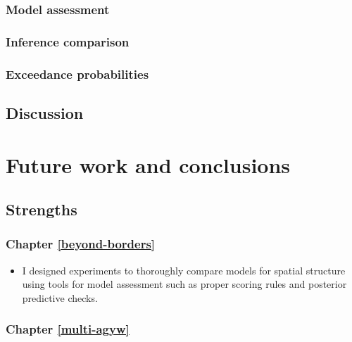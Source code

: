 \documentclass[a4paper, nobind]{templates/ociamthesis}
\providecommand{\tightlist}{%
  \setlength{\itemsep}{0pt}\setlength{\parskip}{0pt}}
\begin{document}
\hypertarget{model-assessment}{%
\subsection{Model assessment}\label{model-assessment}}

\hypertarget{inference-comparison}{%
\subsection{Inference comparison}\label{inference-comparison}}

\hypertarget{exceedance-probabilities}{%
\subsection{Exceedance probabilities}\label{exceedance-probabilities}}

\hypertarget{discussion-2}{%
\section{Discussion}\label{discussion-2}}

\hypertarget{conclusions}{%
\chapter{Future work and conclusions}\label{conclusions}}

\adjustmtc
{}

\hypertarget{strengths}{%
\section{Strengths}\label{strengths}}

\hypertarget{chapter-refbeyond-borders}{%
\subsection{Chapter \ref{beyond-borders}}\label{chapter-refbeyond-borders}}

\begin{itemize}
\tightlist
\item
  I designed experiments to thoroughly compare models for spatial structure using tools for model assessment such as proper scoring rules and posterior predictive checks.
\end{itemize}

\hypertarget{chapter-refmulti-agyw}{%
\subsection{Chapter \ref{multi-agyw}}\label{chapter-refmulti-agyw}}
\end{document}

